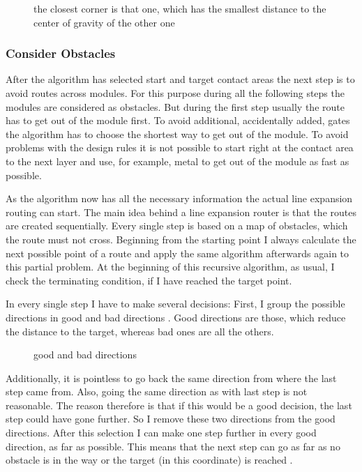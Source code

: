 \begin{figure}
	\centering
	
  	\caption{the closest corner is that one, which has the smallest distance to the center of gravity of the other one}
	\label{fig:rectangles_closest_corner}
\end{figure}

\subsubsection{Consider Obstacles}
After the algorithm has selected start and target contact areas the next step is to avoid routes across modules. For this purpose during all the following steps the modules are considered as obstacles. But during the first step usually the route has to get out of the module first. To avoid additional, accidentally added, gates the algorithm has to choose the shortest way to get out of the module. To avoid problems with the design rules it is not possible to start right at the contact area to the next layer and use, for example, metal to get out of the module as fast as possible.

As the algorithm now has all the necessary information the actual line expansion routing can start. The main idea behind a line expansion router is that the routes are created sequentially. Every single step is based on a map of obstacles, which the route must not cross. Beginning from the starting point I always calculate the next possible point of a route and apply the same algorithm afterwards again to this partial problem. At the beginning of this recursive algorithm, as usual, I check the terminating condition, if I have reached the target point.

In every single step I have to make several decisions: First, I group the possible directions in good and bad directions . Good directions are those, which reduce the distance to the target, whereas bad ones are all the others.

\begin{figure}
	\centering
	
  	\caption{good and bad directions}
	\label{fig:router_good_bad_direction}
\end{figure}

Additionally, it is pointless to go back the same direction from where the last step came from. Also, going the same direction as with last step is not reasonable. The reason therefore is that if this would be a good decision, the last step could have gone further. So I remove these two directions from the good directions. After this selection I can make one step further in every good direction, as far as possible. This means that the next step can go as far as no obstacle is in the way or the target (in this coordinate) is reached .

